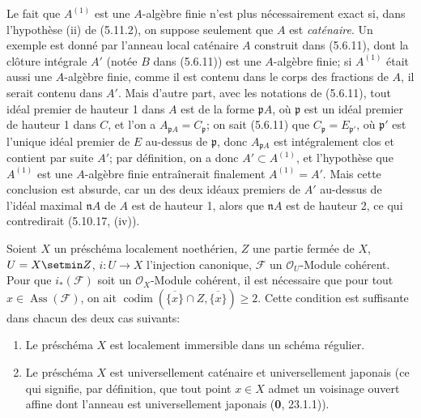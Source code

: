 \begin{remark}[5.11.3]
\label{IV.2.s5.11.3-fr}
Le fait que $A^{(1)}$ est une $A$-algèbre finie n'est plus nécessairement exact
si, dans l'hypothèse (ii) de (5.11.2), on suppose seulement que $A$ est
\emph{caténaire}. Un exemple est donné par l'anneau local caténaire $A$ construit dans
(5.6.11), dont la clôture intégrale $A'$ (notée $B$ dans (5.6.11)) est une
$A$-algèbre finie; si $A^{(1)}$ était aussi une $A$-algèbre finie, comme il est
contenu dans le corps des fractions de $A$, il serait contenu dans $A'$. Mais
d'autre part, avec les notations de (5.6.11), tout idéal premier de hauteur 1
dans $A$ est de la forme $\mathfrak pA$, où $\mathfrak p$ est un idéal premier
de hauteur 1 dans $C$, et l'on a
$A_{\mathfrak pA}=C_\mathfrak p$; on sait (5.6.11) que
$C_\mathfrak p=E_{\mathfrak p'}$, où $\mathfrak p'$ est l'unique idéal
premier de $E$ au-dessus de $\mathfrak p$, donc $A_{\mathfrak pA}$ est
intégralement clos et contient par suite $A'$; par définition, on a donc
$A'\subset A^{(1)}$, et l'hypothèse que $A^{(1)}$ est une $A$-algèbre finie
entraînerait finalement $A^{(1)}=A'$. Mais cette conclusion est absurde, car un
des deux idéaux premiers de $A'$ au-dessus de l'idéal maximal $\mathfrak nA$ de
$A$ est de hauteur 1, alors que $\mathfrak nA$ est de hauteur 2, ce qui
contredirait (5.10.17, (iv)).
\end{remark}

\begin{corollary}[5.11.4]
Soient $X$ un préschéma localement noethérien, $Z$ une partie fermée de $X$,
$U=X\setmin Z$, $i:U\to X$ l'injection canonique, $\mathcal F$ un
$\mathcal O_U$-Module cohérent. Pour que $i_*(\mathcal F)$ soit un
$\mathcal O_X$-Module cohérent, il est nécessaire que pour tout
$x\in\operatorname{Ass}(\mathcal F)$, on ait
$\operatorname{codim}(\overline{\{x\}}\cap Z,\overline{\{x\}})\geq2$.
Cette condition est suffisante dans chacun des deux cas suivants:
\begin{enumerate}
\item[\textup{(i)}] Le préschéma $X$ est localement immersible dans un schéma régulier.
\item[\textup{(ii)}] Le préschéma $X$ est universellement caténaire et universellement
japonais \textup{(ce qui signifie, par définition, que tout point $x\in X$ admet un
voisinage ouvert affine dont l'anneau est} universellement japonais \textup{(\textbf{0},
23.1.1))}.
\end{enumerate}
\end{corollary}

